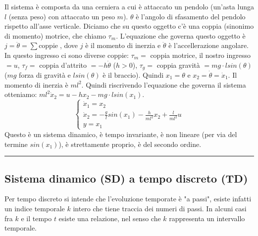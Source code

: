 Il sistema è composta da una cerniera a cui è attaccato un pendolo (un'asta lunga $l$ (senza peso) con attaccato un peso $m$). $\theta$ è l'angolo di sfasamento del pendolo rispetto all'asse verticale. Diciamo che su questo oggetto c'è una coppia (sinonimo di momento) motrice, che chiamo $\tau_m$.\newline
L'equazione che governa questo oggetto è $j = \ddot{\theta} = \sum \text{coppie}\;$, dove $j$ è il momento di inerzia e $\ddot{\theta}$ è l'accellerazione angolare. In questo ingresso ci sono diverse coppie: $\tau_m =$ coppia motrice, il nostro ingresso $= u$, $\tau_f= $ coppia d'attrito $=-h \dot{\theta}$ ($h>0$), $\tau_g =$ coppia gravità $= mg \cdot  l sin(\theta)$ ($mg$ forza di gravità e $l sin(\theta)$ è il braccio).\newline
Quindi $x_1 = \theta$ e $x_2 = \dot{\theta} = \dot{x}_1$.\newline
Il momento di inerzia è $m l^2$.\newline
Quindi riscrivendo l'equazione che governa il sistema otteniamo: $m l^2 \dot{x}_2 = u - h x_2 - m g \cdot l sin(x_1)$.
\[
    \begin{cases}
        \dot{x}_1 = x_2\\
        \dot{x}_2 = - \frac{g}{l} sin(x_1) - \frac{h}{ml^2}x_2 + \frac{l}{ml^2}u\\
        y = x_1
    \end{cases}
\]
Questo è un sistema dinamico, è tempo invariante, è non lineare (per via del termine $sin(x_1)$), è strettamente proprio, è del secondo ordine.\newline
\rule{\textwidth}{0,4pt}
\subsection{Sistema dinamico (SD) a tempo discreto (TD)}
Per tempo discreto si intende che l'evoluzione temporate è "a passi", esiste infatti un indice temporale $k$ intero che tiene traccia dei numeri di passi. In alcuni casi fra $k$ e il tempo $t$ esiste una relazione, nel senso che $k$ rappresenta un intervallo temporale.
